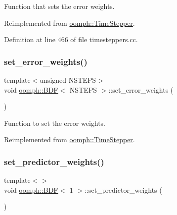 Function that sets the error weights. 



Reimplemented from \hyperlink{classoomph_1_1TimeStepper_aee0c1da870a603e64efebb51dfc96a3d}{oomph\+::\+Time\+Stepper}.



Definition at line 466 of file timesteppers.\+cc.

\mbox{\label{classoomph_1_1BDF_ae7edaffc90cfe8cca6817751fa3cccb8}} 
\subsubsection{\texorpdfstring{set\+\_\+error\+\_\+weights()}{set\_error\_weights()}\hspace{0.1cm}{\footnotesize\ttfamily [4/4]}}
{\footnotesize\ttfamily template$<$unsigned N\+S\+T\+E\+PS$>$ \\
void \hyperlink{classoomph_1_1BDF}{oomph\+::\+B\+DF}$<$ N\+S\+T\+E\+PS $>$\+::set\+\_\+error\+\_\+weights (\begin{DoxyParamCaption}{ }\end{DoxyParamCaption})\hspace{0.3cm}{\ttfamily [virtual]}}



Function to set the error weights. 



Reimplemented from \hyperlink{classoomph_1_1TimeStepper_aee0c1da870a603e64efebb51dfc96a3d}{oomph\+::\+Time\+Stepper}.

\mbox{\label{classoomph_1_1BDF_ac568d7f427667cf6a80b772aa3431980}} 
\subsubsection{\texorpdfstring{set\+\_\+predictor\+\_\+weights()}{set\_predictor\_weights()}\hspace{0.1cm}{\footnotesize\ttfamily [1/4]}}
{\footnotesize\ttfamily template$<$$>$ \\
void \hyperlink{classoomph_1_1BDF}{oomph\+::\+B\+DF}$<$ 1 $>$\+::set\+\_\+predictor\+\_\+weights (\begin{DoxyParamCaption}{ }\end{DoxyParamCaption})\hspace{0.3cm}{\ttfamily [virtual]}}



